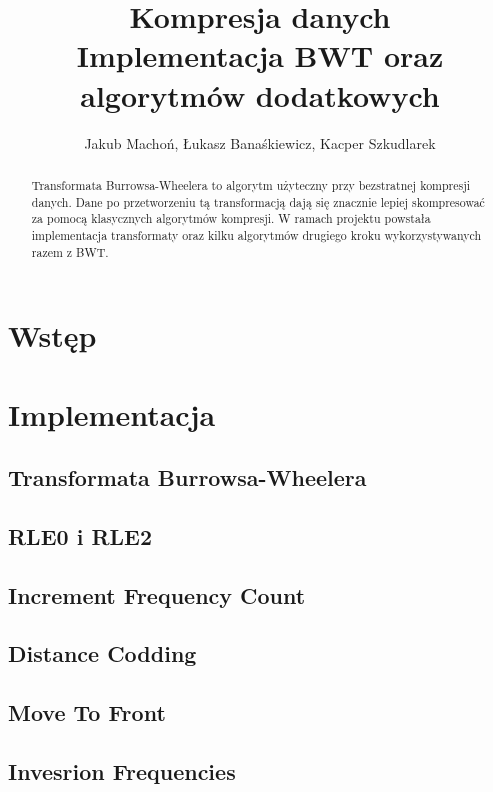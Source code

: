 \documentclass[a4paper,12pt]{article}
\begin{document}
\title{{\small Kompresja danych}\\Implementacja BWT oraz algorytmów dodatkowych}
\author{Jakub Machoń, Łukasz Banaśkiewicz, Kacper Szkudlarek}

\maketitle

\begin{abstract}
Transformata Burrowsa-Wheelera to algorytm użyteczny przy bezstratnej kompresji danych. Dane po przetworzeniu tą transformacją dają się znacznie lepiej skompresować za pomocą klasycznych algorytmów kompresji. W ramach projektu powstała implementacja transformaty oraz kilku algorytmów drugiego kroku wykorzystywanych razem z BWT.
\end{abstract}


\section{Wstęp}


\section{Implementacja}

\subsection{Transformata Burrowsa-Wheelera}

\subsection{RLE0 i RLE2}

\subsection{Increment Frequency Count}

\subsection{Distance Codding}

\subsection{Move To Front}

\subsection{Invesrion Frequencies}
\end{document}

